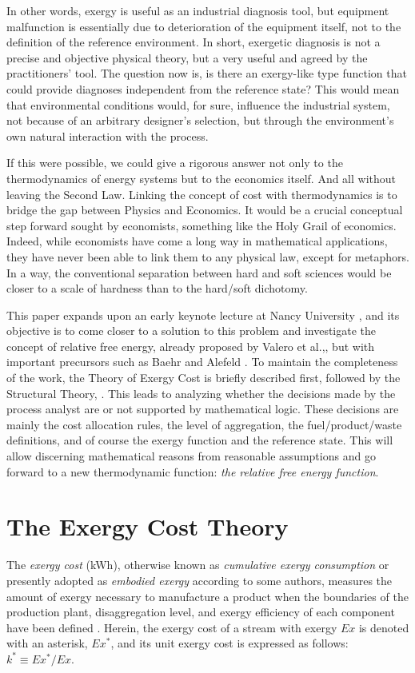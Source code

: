 \documentclass[energies,article,submit,moreauthors,pdftex]{Definitions/mdpi}
\begin{document}
In other words, exergy is useful as an industrial diagnosis tool, but equipment malfunction is essentially due to deterioration of the equipment itself, not to the definition of the reference environment. In short, exergetic diagnosis is not a precise and objective physical theory, but a very useful and agreed by the practitioners’ tool. The question now is, is there an exergy-like type function that could provide diagnoses independent from the reference state? This would mean that environmental conditions would, for sure, influence the industrial system, not because of an arbitrary designer's selection, but through the environment's own natural interaction with the process.

If this were possible, we could give a rigorous answer not only to the thermodynamics of energy systems but to the economics itself. And all without leaving the Second Law. Linking the concept of cost with thermodynamics is to bridge the gap between Physics and Economics. It would be a crucial conceptual step forward sought by economists, something like the Holy Grail of economics. Indeed, while economists have come a long way in mathematical applications, they have never been able to link them to any physical law, except for metaphors. In a way, the conventional separation between hard and soft sciences would be closer to a scale of hardness than to the hard/soft dichotomy.

This paper expands upon an early keynote lecture at Nancy University \cite{Valero2018}, and its objective is to come closer to a solution to this problem and investigate the concept of relative free energy, already proposed by Valero et al.,\cite{Valero1992b}, but with important precursors such as Baehr \cite{Baehr2005} and Alefeld \cite{Alefeld1988}. To maintain the completeness of the work, the Theory of Exergy Cost is briefly described first, followed by the Structural Theory, \cite{Valero1992a}. This leads to analyzing whether the decisions made by the process analyst are or not supported by mathematical logic. These decisions are mainly the cost allocation rules, the level of aggregation, the fuel/product/waste definitions, and of course the exergy function and the reference state. This will allow discerning mathematical reasons from reasonable assumptions and go forward to a new thermodynamic function: \emph{the relative free energy function}.

\section{The Exergy Cost Theory}
The \emph{exergy cost} (kWh), otherwise known as \emph{cumulative exergy consumption} \cite{Morris1986,Szargut1988} or presently adopted as \emph{embodied exergy} according to some authors, measures the amount of exergy necessary to manufacture a product when the boundaries of the production plant, disaggregation level, and exergy efficiency of each component have been defined \cite{Valero1986a,Lozano1993}. Herein, the exergy cost of a stream with exergy $Ex$ is denoted with an asterisk, $Ex^*$, and its unit exergy cost is expressed as follows: $k^*\equiv Ex^*/Ex$.
\end{document}

